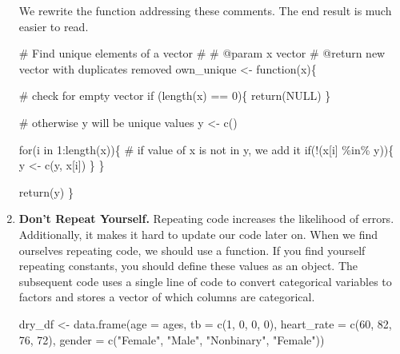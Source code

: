\documentclass[
  letterpaper,
]{latex/krantz}
\makeatletter
\newenvironment{Shaded}{\begin{snugshade}}{\end{snugshade}}
\newcommand{\AttributeTok}[1]{\textcolor[rgb]{0.40,0.45,0.13}{#1}}
\newcommand{\CommentTok}[1]{\textcolor[rgb]{0.37,0.37,0.37}{#1}}
\newcommand{\ConstantTok}[1]{\textcolor[rgb]{0.56,0.35,0.01}{#1}}
\newcommand{\ControlFlowTok}[1]{\textcolor[rgb]{0.00,0.23,0.31}{#1}}
\newcommand{\DecValTok}[1]{\textcolor[rgb]{0.68,0.00,0.00}{#1}}
\newcommand{\FunctionTok}[1]{\textcolor[rgb]{0.28,0.35,0.67}{#1}}
\newcommand{\NormalTok}[1]{\textcolor[rgb]{0.00,0.23,0.31}{#1}}
\newcommand{\OtherTok}[1]{\textcolor[rgb]{0.00,0.23,0.31}{#1}}
\newcommand{\SpecialCharTok}[1]{\textcolor[rgb]{0.37,0.37,0.37}{#1}}
\newcommand{\StringTok}[1]{\textcolor[rgb]{0.13,0.47,0.30}{#1}}
\newenvironment{kframe}{%
\medskip{}
\setlength{\fboxsep}{.8em}
 \def\at@end@of@kframe{}%
 \ifinner\ifhmode%
  \def\at@end@of@kframe{\end{minipage}}%
  \begin{minipage}{\columnwidth}%
 \fi\fi%
 \def\FrameCommand##1{\hskip\@totalleftmargin \hskip-\fboxsep
 \colorbox{shadecolor}{##1}\hskip-\fboxsep
     \hskip-\linewidth \hskip-\@totalleftmargin \hskip\columnwidth}%
 \MakeFramed {\advance\hsize-\width
   \@totalleftmargin\z@ \linewidth\hsize
   \@setminipage}}%
 {\par\unskip\endMakeFramed%
 \at@end@of@kframe}
\renewenvironment{Shaded}{\begin{kframe}}{\end{kframe}}
\makeatother
\begin{document}
\begin{enumerate}
  We rewrite the function addressing these comments. The end result is
  much easier to read.

\begin{Shaded}
\begin{Highlighting}[]
\CommentTok{\#\textquotesingle{} Find unique elements of a vector }
\CommentTok{\#\textquotesingle{}}
\CommentTok{\#\textquotesingle{} @param x vector}
\CommentTok{\#\textquotesingle{} @return new vector with duplicates removed}
\NormalTok{own\_unique }\OtherTok{\textless{}{-}} \ControlFlowTok{function}\NormalTok{(x)\{}

  \CommentTok{\# check for empty vector}
  \ControlFlowTok{if}\NormalTok{ (}\FunctionTok{length}\NormalTok{(x) }\SpecialCharTok{==} \DecValTok{0}\NormalTok{)\{ }
    \FunctionTok{return}\NormalTok{(}\ConstantTok{NULL}\NormalTok{)}
\NormalTok{  \}}

  \CommentTok{\# otherwise y will be unique values}
\NormalTok{  y }\OtherTok{\textless{}{-}} \FunctionTok{c}\NormalTok{()}

  \ControlFlowTok{for}\NormalTok{(i }\ControlFlowTok{in} \DecValTok{1}\SpecialCharTok{:}\FunctionTok{length}\NormalTok{(x))\{ }
    \CommentTok{\# if value of x is not in y, we add it}
    \ControlFlowTok{if}\NormalTok{(}\SpecialCharTok{!}\NormalTok{(x[i] }\SpecialCharTok{\%in\%}\NormalTok{ y))\{ }
\NormalTok{      y }\OtherTok{\textless{}{-}} \FunctionTok{c}\NormalTok{(y, x[i]) }
\NormalTok{    \}}
\NormalTok{  \}}

  \FunctionTok{return}\NormalTok{(y) }
\NormalTok{\}}
\end{Highlighting}
\end{Shaded}
\item
  \textbf{Don't Repeat Yourself.} Repeating code increases the
  likelihood of errors. Additionally, it makes it hard to update our
  code later on. When we find ourselves repeating code, we should use a
  function. If you find yourself repeating constants, you should define
  these values as an object. The subsequent code uses a single line of
  code to convert categorical variables to factors and stores a vector
  of which columns are categorical.

\begin{Shaded}
\begin{Highlighting}[]
\NormalTok{dry\_df }\OtherTok{\textless{}{-}} \FunctionTok{data.frame}\NormalTok{(}\AttributeTok{age =}\NormalTok{ ages,}
                    \AttributeTok{tb =} \FunctionTok{c}\NormalTok{(}\DecValTok{1}\NormalTok{, }\DecValTok{0}\NormalTok{, }\DecValTok{0}\NormalTok{, }\DecValTok{0}\NormalTok{),}
                    \AttributeTok{heart\_rate =} \FunctionTok{c}\NormalTok{(}\DecValTok{60}\NormalTok{, }\DecValTok{82}\NormalTok{, }\DecValTok{76}\NormalTok{, }\DecValTok{72}\NormalTok{),}
                    \AttributeTok{gender =} \FunctionTok{c}\NormalTok{(}\StringTok{"Female"}\NormalTok{, }\StringTok{"Male"}\NormalTok{, }\StringTok{"Nonbinary"}\NormalTok{, }
                               \StringTok{"Female"}\NormalTok{))}


\end{Highlighting}
\end{Shaded}
\end{enumerate}
\end{document}
